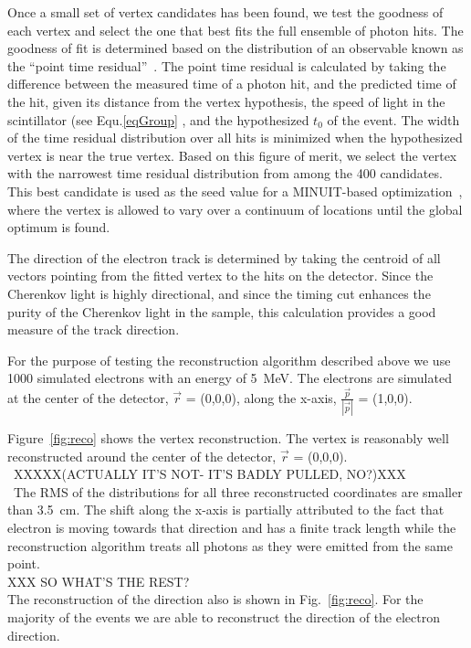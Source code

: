 \documentclass[aps,prc,twocolumn,groupedaddress,showpacs,amsmath,amssymb,floatfix,superscriptaddress]{revtex4}
\begin{document}
Once a small set of vertex candidates has been found, we test the
goodness of each vertex and select the one that best fits the full
ensemble of photon hits. The goodness of fit is determined based on
the distribution of an observable known as the ``point time
residual''~\cite{SuperKalgo}. The point time residual is calculated by
taking the difference between the measured time of a photon hit, and
the predicted time of the hit, given its distance from the vertex
hypothesis, the speed of light in the scintillator (see
Equ.\ref{eqGroup} , and the hypothesized $t_0$ of the event. The width
of the time residual distribution over all hits is minimized when the
hypothesized vertex is near the true vertex. Based on this figure of
merit, we select the vertex with the narrowest time residual
distribution from among the 400 candidates. This best candidate is
used as the seed value for a MINUIT-based optimization~\cite{MINUIT},
where the vertex is allowed to vary over a continuum of locations
until the global optimum is found.

The direction of the electron track is determined by taking the
centroid of all vectors pointing from the fitted vertex to the hits on
the detector. Since the Cherenkov light is highly directional, and
since the timing cut enhances the purity of the Cherenkov light in the
sample, this calculation provides a good measure of the track
direction. 

For the purpose of testing the reconstruction algorithm described
above we use 1000 simulated electrons with an energy of 5~MeV. The
electrons are simulated at the center of the detector, $\vec{r}$ =
(0,0,0), along the x-axis, $\frac{\vec{p}}{|\vec{p}|}$ = (1,0,0).

Figure~\ref{fig:reco} shows the vertex reconstruction. The vertex is
reasonably well reconstructed around the center of the detector, $\vec{r}$
= (0,0,0).\\\ 
XXXXX(ACTUALLY IT'S NOT- IT'S BADLY PULLED, NO?)XXX\\\
The RMS of the distributions for all three reconstructed
coordinates are smaller than 3.5~cm. The shift along the x-axis is
partially attributed to the fact that electron is moving towards that direction
and has a finite track length while the reconstruction algorithm
treats all photons as they were emitted from the same point.\\
XXX SO WHAT'S THE REST?\\
The reconstruction of the direction also is shown in
Fig.~\ref{fig:reco}. For the majority of the events we are able to
reconstruct the direction of the electron direction.
\end{document}
